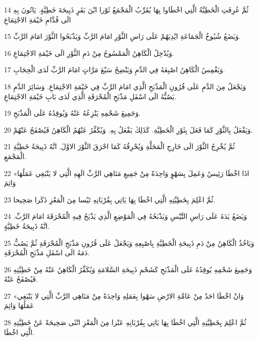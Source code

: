 \par 14 ثُمَّ عُرِفَتِ الْخَطِيَّةُ الَّتِي اخْطَاوا بِهَا يُقَرِّبُ الْمَجْمَعُ ثَوْرا ابْنَ بَقَرٍ ذَبِيحَةَ خَطِيَّةٍ. يَاتُونَ بِهِ الَى قُدَّامِ خَيْمَةِ الاجْتِمَاعِ
\par 15 وَيَضَعُ شُيُوخُ الْجَمَاعَةِ ايْدِيَهُمْ عَلَى رَاسِ الثَّوْرِ امَامَ الرَّبِّ وَيَذْبَحُوا الثَّوْرَ امَامَ الرَّبِّ.
\par 16 وَيُدْخِلُ الْكَاهِنُ الْمَمْسُوحُ مِنْ دَمِ الثَّوْرِ الَى خَيْمَةِ الاجْتِمَاعِ.
\par 17 وَيَغْمِسُ الْكَاهِنُ اصْبِعَهُ فِي الدَّمِ وَيَنْضِحُ سَبْعَ مَرَّاتٍ امَامَ الرَّبِّ لَدَى الْحِجَابِ.
\par 18 وَيَجْعَلُ مِنَ الدَّمِ عَلَى قُرُونِ الْمَذْبَحِ الَّذِي امَامَ الرَّبِّ فِي خَيْمَةِ الاجْتِمَاعِ. وَسَائِرَ الدَّمِ يَصُبُّهُ الَى اسْفَلِ مَذْبَحِ الْمُحْرَقَةِ الَّذِي لَدَى بَابِ خَيْمَةِ الاجْتِمَاعِ.
\par 19 وَجَمِيعَ شَحْمِهِ يَنْزِعُهُ عَنْهُ وَيُوقِدُهُ عَلَى الْمَذْبَحِ.
\par 20 وَيَفْعَلُ بِالثَّوْرِ كَمَا فَعَلَ بِثَوْرِ الْخَطِيَّةِ. كَذَلِكَ يَفْعَلُ بِهِ. وَيُكَفِّرُ عَنْهُمُ الْكَاهِنُ فَيُصْفَحُ عَنْهُمْ.
\par 21 ثُمَّ يُخْرِجُ الثَّوْرَ الَى خَارِجِ الْمَحَلَّةِ وَيُحْرِقُهُ كَمَا احْرَقَ الثَّوْرَ الاوَّلَ. انَّهُ ذَبِيحَةُ خَطِيَّةِ الْمَجْمَعِ.
\par 22 «اذَا اخْطَا رَئِيسٌ وَعَمِلَ بِسَهْوٍ وَاحِدَةً مِنْ جَمِيعِ مَنَاهِي الرَّبِّ الَهِهِ الَّتِي لا يَنْبَغِي عَمَلُهَا وَاثِمَ
\par 23 ثُمَّ اعْلِمَ بِخَطِيَّتِهِ الَّتِي اخْطَا بِهَا يَاتِي بِقُرْبَانِهِ تَيْسا مِنَ الْمَعْزِ ذَكَرا صَحِيحا.
\par 24 وَيَضَعُ يَدَهُ عَلَى رَاسِ التَّيْسِ وَيَذْبَحُهُ فِي الْمَوْضِعِ الَّذِي يَذْبَحُ فِيهِ الْمُحْرَقَةَ امَامَ الرَّبِّ. انَّهُ ذَبِيحَةُ خَطِيَّةٍ.
\par 25 وَيَاخُذُ الْكَاهِنُ مِنْ دَمِ ذَبِيحَةِ الْخَطِيَّةِ بِاصْبِعِهِ وَيَجْعَلُ عَلَى قُرُونِ مَذْبَحِ الْمُحْرَقَةِ ثُمَّ يَصُبُّ دَمَهُ الَى اسْفَلِ مَذْبَحِ الْمُحْرَقَةِ.
\par 26 وَجَمِيعَ شَحْمِهِ يُوقِدُهُ عَلَى الْمَذْبَحِ كَشَحْمِ ذَبِيحَةِ السَّلامَةِ وَيُكَفِّرُ الْكَاهِنُ عَنْهُ مِنْ خَطِيَّتِهِ فَيُصْفَحُ عَنْهُ.
\par 27 «وَانْ اخْطَا احَدٌ مِنْ عَامَّةِ الارْضِ سَهْوا بِعَمَلِهِ وَاحِدَةً مِنْ مَنَاهِي الرَّبِّ الَّتِي لا يَنْبَغِي عَمَلُهَا وَاثِمَ
\par 28 ثُمَّ اعْلِمَ بِخَطِيَّتِهِ الَّتِي اخْطَا بِهَا يَاتِي بِقُرْبَانِهِ عَنْزا مِنَ الْمَعْزِ انْثَى صَحِيحَةً عَنْ خَطِيَّتِهِ الَّتِي اخْطَا.
